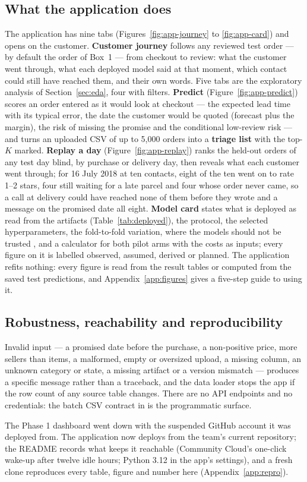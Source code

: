 \subsection{What the application does}

The application has nine tabs (Figures~\ref{fig:app-journey} to
\ref{fig:app-card}) and opens on the customer. \textbf{Customer journey} follows
any reviewed test order --- by default the order of Box~1 --- from checkout to
review: what the customer went through, what each deployed model said at that
moment, which contact could still have reached them, and their own words. Five
tabs are the exploratory analysis of Section~\ref{sec:eda}, four with filters.
\textbf{Predict} (Figure~\ref{fig:app-predict}) scores an order entered as it
would look at checkout --- the expected lead time with its typical error, the
date the customer would be quoted (forecast plus the margin), the risk of
missing the promise and the conditional low-review risk --- and turns an
uploaded CSV of up to 5{,}000 orders into a \textbf{triage list} with the
top-$K$ marked. \textbf{Replay a day}
(Figure~\ref{fig:app-replay}) ranks the held-out orders of any test day blind, by
purchase or delivery day, then reveals what each customer went through; for 16
July 2018 at ten contacts, eight of the ten went on to rate 1--2 stars, four
still waiting for a late parcel and four whose order never came, so a call at
delivery could have reached none of them before they wrote and a message on the
promised date all eight. \textbf{Model card} states what is deployed as read from
the artifacts (Table~\ref{tab:deployed}), the protocol, the selected
hyperparameters, the fold-to-fold variation, where the models should not be
trusted \citep{mitchell2019modelcards}, and a calculator for both pilot arms with
the costs as inputs; every figure on it is labelled observed, assumed, derived
or planned. The application refits nothing: every figure is read from the result
tables or computed from the saved test predictions, and
Appendix~\ref{app:figures} gives a five-step guide to using it.

\subsection{Robustness, reachability and reproducibility}

Invalid input --- a promised date before the purchase, a non-positive price,
more sellers than items, a malformed, empty or oversized upload, a missing
column, an unknown category or state, a missing artifact or a version mismatch
--- produces a specific message rather than a traceback, and the data loader
stops the app if the row count of any source table changes. There are no API
endpoints and no credentials: the batch CSV contract in
 is the programmatic surface.

The Phase 1 dashboard went down with the suspended GitHub account it was
deployed from. The application now deploys from the team's current repository;
the README records what keeps it reachable (Community Cloud's one-click wake-up
after twelve idle hours; Python 3.12 in the app's settings), and a fresh clone
reproduces every table, figure and number here (Appendix~\ref{app:repro}).

